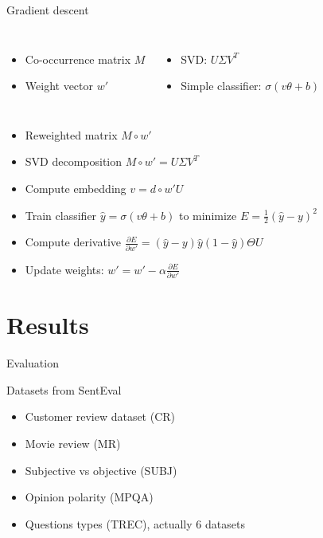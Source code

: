 \documentclass[xcolor={table}]{beamer}
\begin{document}
\begin{frame}{Gradient descent}
    \begin{columns}
    \begin{itemize}
        \item Co-occurrence matrix $M$
        \item Weight vector $w'$
    \end{itemize}
    \begin{itemize}
        \item SVD: $U \Sigma V^T$
        \item Simple classifier: $\sigma (v \theta + b)$
    \end{itemize}
    \end{columns}

    \begin{block}{}
    \begin{itemize}
        \item Reweighted matrix $M \circ w'$
        \item SVD decomposition $M \circ w' = U \Sigma V^T$
        \item Compute embedding $v = d \circ w' U$
        \item Train classifier $\hat{y} = \sigma (v \theta + b)$ to minimize $E = \frac{1}{2}(\hat{y}-y)^2$
        \item Compute derivative $\frac{\partial E}{\partial w'} = (\hat{y} -y) \hat{y} (1-\hat{y})\Theta U$
        \item Update weights: $w' = w' - \alpha \frac{\partial E}{\partial w'}$
    \end{itemize}    
    \end{block}
\end{frame} 

\section{Results}
\begin{frame}{Evaluation}
    \begin{block}{Datasets from SentEval \cite{conneau2017supervised}}
        \begin{itemize}
            \item Customer review dataset (CR)
            \item Movie review (MR)
            \item Subjective vs objective (SUBJ)
            \item Opinion polarity (MPQA)
            \item Questions types (TREC), actually $6$ datasets
        \end{itemize}
    \end{block}
    
\end{frame} 
\end{document}
